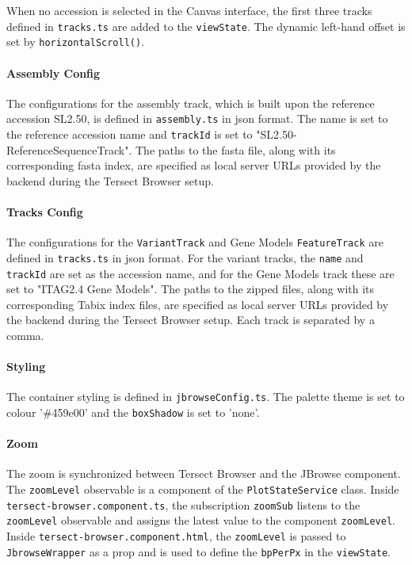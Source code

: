 \documentclass[12pt]{article}
\begin{document}
\begin{itemize}
When no accession is selected in the Canvas interface, the first three tracks defined in \verb +tracks.ts+ are added to the \verb +viewState+. The dynamic left-hand offset is set by \verb +horizontalScroll()+. 


\paragraph{Assembly Config}

The configurations for the assembly track, which is built upon the reference accession SL2.50, is defined in \verb +assembly.ts+ in json format. The name is set to the reference accession name and \verb +trackId+ is set to "SL2.50-ReferenceSequenceTrack". The paths to the fasta file, along with its corresponding fasta index, are specified as local server URLs provided by the backend during the Tersect Browser setup. 

\paragraph{Tracks Config} 
The configurations for the \verb +VariantTrack+ and Gene Models \verb +FeatureTrack+ are defined in \verb +tracks.ts+ in json format. For the variant tracks, the \verb +name+ and \verb +trackId+ are set as the accession name, and for the Gene Models track these are set to "ITAG2.4 Gene Models".  The paths to the zipped files, along with its corresponding Tabix index files, are specified as local server URLs provided by the backend during the Tersect Browser setup. Each track is separated by a comma. 

\paragraph{Styling}
The container styling is defined in \verb +jbrowseConfig.ts+. The palette theme is set to colour '\#459e00' and the \verb +boxShadow+ is set to 'none'. 

\paragraph{Zoom} 
The zoom is synchronized between Tersect Browser and the JBrowse component. The \verb +zoomLevel+ observable is a component of the \verb +PlotStateService+ class. Inside \verb +tersect-browser.component.ts+, the subscription \verb +zoomSub+ listens to the \verb +zoomLevel+ observable and assigns the latest value to the component \verb +zoomLevel+. Inside \verb +tersect-browser.component.html+, the \verb +zoomLevel+ is passed to \verb +JbrowseWrapper+ as a prop and is used to define the \verb +bpPerPx+ in the \verb +viewState+. 


\end{itemize}
\end{document}
